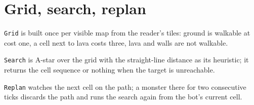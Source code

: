 \section{Grid, search, replan}
\verb|Grid| is built once per visible map from the reader's tiles: ground is walkable at cost one, a cell next to lava costs three, lava and walls are not walkable.

\verb|Search| is A-star over the grid with the straight-line distance as its heuristic; it returns the cell sequence or nothing when the target is unreachable.

\verb|Replan| watches the next cell on the path; a monster there for two consecutive ticks discards the path and runs the search again from the bot's current cell.
